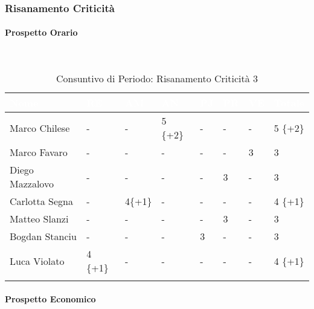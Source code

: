 \subsubsection{Risanamento Criticità}
\label{RA3}
\paragraph{Prospetto Orario} \-\\
\begin{longtable}{|C{.30\textwidth}|C{.06\textwidth}|C{.06\textwidth}|C{.06\textwidth} | C{.06\textwidth}| C{.06\textwidth} | C{.06\textwidth} | C{.10\textwidth} |}
	\hline
		\textbf{\textcolor{white}{Nome}} & \textbf{\textcolor{white}{RE}} & \textbf{\textcolor{white}{AM}} & \textbf{\textcolor{white}{AN}} & \textbf{\textcolor{white}{PJ}} & \textbf{\textcolor{white}{PR}} & \textbf{\textcolor{white}{VE}} & \textbf{\textcolor{white}{Totale}}\\
	\hline \hline
	
	Marco Chilese & - & - & 5 \{+2\} & - & - & - & 5 \{+2\}\\
	\hline
	Marco Favaro & - & - & - & - & - & 3 & 3 \\
	\hline
	Diego Mazzalovo & - & - & - & - & 3  & - & 3\\
	\hline
	Carlotta Segna & - & 4\{+1\} & - & - & - & - & 4 \{+1\}\\
	\hline
	Matteo Slanzi & - & - & - & - & 3 & - & 3\\
	\hline
	Bogdan Stanciu & - & - & - & 3 & - & - & 3 \\
	\hline
	Luca Violato & 4 \{+1\} & - & - & - & - & - & 4 \{+1\}\\
	\hline
	\caption{Consuntivo di Periodo: Risanamento Criticità 3}
	\label{Distribuzione oraria del periodo di rc3}
\end{longtable}

\paragraph{Prospetto Economico} \-\\

